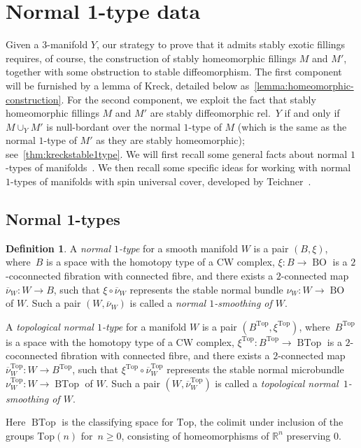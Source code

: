 \documentclass[a4paper, reqno]{amsart}
\theoremstyle{definition}
\newtheorem{definition}[proposition]{Definition}
\theoremstyle{remark}
\renewcommand{\top}{\mathrm{Top}}
\newcommand{\R}{\mathbb{R}}
\DeclareMathOperator{\BTop}{BTop}
\DeclareMathOperator{\BO}{BO}
\begin{document}
\bigskip 

\section{Normal 1-type data}\label{section:norma-1-type-data}

Given a $3$-manifold $Y$, our strategy to prove that it admits stably exotic fillings requires, of course, the construction of stably homeomorphic fillings $M$ and $M'$, together with some obstruction to stable diffeomorphism. The first component will be furnished by a lemma of Kreck, detailed below as~\cref{lemma:homeomorphic-construction}. For the second component, we exploit the fact that stably homeomorphic fillings $M$ and $M'$ are stably diffeomorphic rel.~$Y$ if and only if $M\cup_Y M'$ is null-bordant over the normal $1$-type of $M$ (which is the same as the normal $1$-type of $M'$ as they are stably homeomorphic); see~\cref{thm:kreckstable1type}. We will first recall some general facts about normal $1$-types of manifolds~\cite{surgeryandduality}. We then recall some specific ideas for working with normal $1$-types of manifolds with spin universal cover, developed by Teichner~\cite{teichnerthesis}.

\subsection{Normal 1-types}

\begin{definition}
    A \emph{normal $1$-type} for a smooth manifold $W$ is a pair $(B,\xi)$, where~$B$ is a space with the homotopy type of a CW complex, $\xi\colon B\to \BO$ is a $2$-coconnected fibration with connected fibre, and there exists a $2$-connected map $\overline{\nu}_W\colon W\to B$, such that $\xi\circ\overline{\nu}_W$ represents the stable normal bundle $\nu_W \colon W \to \BO$ of $W$. Such a pair $(W,\overline{\nu}_W)$ is called a \emph{normal $1$-smoothing of $W$}.

    A \emph{topological normal $1$-type} for a manifold $W$ is a pair $(B^{\top},\xi^{\top})$, where~$B^{\top}$ is a space with the homotopy type of a CW complex, $\xi^{\top}\colon B^{\top}\to \BTop$ is a $2$-coconnected fibration with connected fibre, and there exists a $2$-connected map $\overline{\nu}^{\top}_W\colon W\to B^{\top}$, such that $\xi^{\top}\circ\overline{\nu}_W^{\top}$ represents the stable normal microbundle $\nu_W^{\top} \colon W \to \BTop$ of $W$. Such a pair $(W,\overline{\nu}_W^{\top})$ is called a \emph{topological normal~$1$-smoothing of $W$}. 
    
    Here $\BTop$ is the classifying space for $\top$, the colimit under inclusion of the groups $\top(n)$ for~$n\geq 0$, consisting of homeomorphisms of $\R^n$ preserving $0$.
\end{definition}
\end{document}
